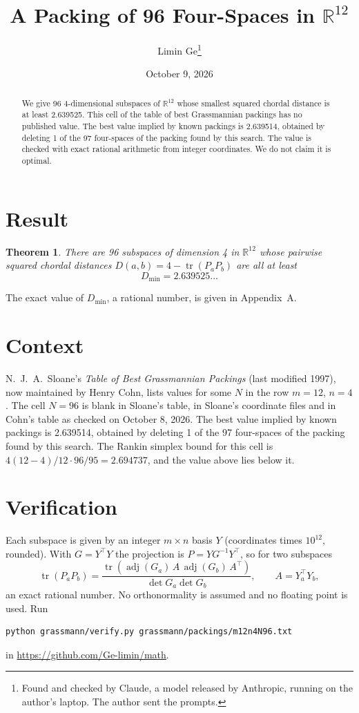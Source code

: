 \documentclass[11pt,a4paper]{article}
\title{A Packing of 96 Four-Spaces in $\mathbb{R}^{12}$}
\author{Limin Ge\thanks{Found and checked by Claude, a model released by Anthropic, running on the author's laptop. The author sent the prompts.}}
\date{October 9, 2026}
\newtheorem*{theorem}{Theorem}
\begin{document}
\maketitle
\begin{abstract}
We give 96 4-dimensional subspaces of $\mathbb{R}^{12}$ whose smallest squared chordal distance is at least 2.639525. This cell of the table of best Grassmannian packings has no published value. The best value implied by known packings is 2.639514, obtained by deleting 1 of the 97 four-spaces of the packing found by this search. The value is checked with exact rational arithmetic from integer coordinates. We do not claim it is optimal.
\end{abstract}

\section{Result}
\begin{theorem}
There are 96 subspaces of dimension 4 in $\mathbb{R}^{12}$ whose pairwise squared chordal distances $D(a,b) = 4 - \operatorname{tr}(P_aP_b)$ are all at least
\[ D_{\min} = 2.639525\ldots \]
\end{theorem}
The exact value of $D_{\min}$, a rational number, is given in Appendix~A.


\section{Context}
N.~J.~A.~Sloane's \emph{Table of Best Grassmannian Packings} (last modified 1997), now maintained by Henry Cohn, lists values for some $N$ in the row $m=12$, $n=4$. The cell $N=96$ is blank in Sloane's table, in Sloane's coordinate files and in Cohn's table as checked on October 8, 2026. The best value implied by known packings is 2.639514, obtained by deleting 1 of the 97 four-spaces of the packing found by this search. The Rankin simplex bound for this cell is $4(12-4)/12\cdot 96/95 = 2.694737$, and the value above lies below it.


\section{Verification}
Each subspace is given by an integer $m\times n$ basis $Y$ (coordinates times $10^{12}$, rounded). With $G=Y^\top Y$ the projection is $P=YG^{-1}Y^\top$, so for two subspaces
\[ \operatorname{tr}(P_aP_b)=\frac{\operatorname{tr}(\operatorname{adj}(G_a)\,A\,\operatorname{adj}(G_b)\,A^\top)}{\det G_a\det G_b},\qquad A=Y_a^\top Y_b, \]
an exact rational number. No orthonormality is assumed and no floating point is used. Run
\begin{verbatim}
python grassmann/verify.py grassmann/packings/m12n4N96.txt
\end{verbatim}
in \url{https://github.com/Ge-limin/math}.
\end{document}

